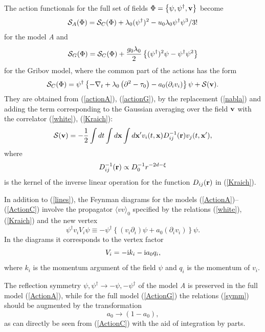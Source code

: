 \documentclass[12pt]{article}
\def\S{{\cal S}}
\def\bfr{{\bf r}}
\def\bfx{{\bf x}}
\def\bfv{{\bf v}}
\begin{document}
The action functionals for the full set of fields
$\Phi = \left\{ \psi,\psi^{\dag},{\bf v} \right\}$ become
\begin{eqnarray}
\S_{A}(\Phi) = \S_{C}(\Phi) + \lambda_{0} (\psi^{\dag})^{2}
- u_{0}\lambda_{0} \psi^{\dag} \psi^{3} /3!
\label{ActionA}
\end{eqnarray}
for the model {\it A} and
\begin{eqnarray}
\S_{G}(\Phi) = \S_{C}(\Phi)
+ \frac{g_{0}\lambda_{0}}{2} \left\{ (\psi^{\dagger})^2\psi -
\psi^{\dagger}\psi^2  \right\}
\label{ActionG}
\end{eqnarray}
for the Gribov model, where the common part of the actions has the form
\begin{eqnarray}
\S_{C}(\Phi) =  \psi^{\dag} \left\{
-\nabla_{t} + \lambda_{0}\left( \partial^{2}- \tau_{0}\right)
- a_{0} (\partial_{i}v_{i}) \right\} \psi +  \S(\bfv).
\label{ActionC}
\end{eqnarray}
They are obtained from (\ref{actionA}), (\ref{actionG}), by the replacement
(\ref{nabla}) and adding the term corresponding to the Gaussian averaging
over the field $\bfv$ with the correlator (\ref{white}), (\ref{Kraich}):
\begin{eqnarray}
\S(\bfv) = -\frac{1}{2} \int dt \int d{\bf x} \int d{\bf x'}
v_{i} (t,\bfx) D_{ij}^{-1}(\bfr) v_{j} (t, {\bf x'}),
\label{Sv}
\end{eqnarray}
where
\[ D_{ij}^{-1}(\bfr) \propto D_{0}^{-1} r^{-2d-\xi} \]
is the kernel of the inverse linear operation for the function
$D_{ij}(\bfr)$ in (\ref{Kraich}).

In addition to (\ref{lines}), the Feynman diagrams for the models
(\ref{ActionA})--(\ref{ActionC}) involve the propagator
$\langle vv \rangle_{0}$ specified by the relations (\ref{white}),
(\ref{Kraich}) and the new vertex
\begin{equation}
\psi^{\dag} v_{i} V_{i} \psi \equiv -
\psi^{\dag}\left\{ (v_{i}\partial_{i}) \psi + a_{0}(\partial_{i}v_{i})
\right\} \psi.
\label{Vertex}
\end{equation}
In the diagrams it corresponds to the vertex factor
\begin{equation}
V_{i} = - {\rm i} k_{i} - {\rm i} a_{0} q_{i},
\label{VertexF}
\end{equation}
where $k_{i}$ is the momentum argument of the field $\psi$ and
$q_{i}$ is the momentum of $v_{i}$.

The reflection symmetry $\psi, \psi^{\dag} \to -\psi, -\psi^{\dag}$
of the model
{\it A} is preserved in the full model (\ref{ActionA}), while for
the full model (\ref{ActionG}) the relations (\ref{symm}) should be
augmented by the transformation
\begin{equation}
a_{0} \to (1-a_{0}),
\label{symmG}
\end{equation}
as can directly be seen from (\ref{ActionC}) with the aid of integration
by parts.
\end{document}
